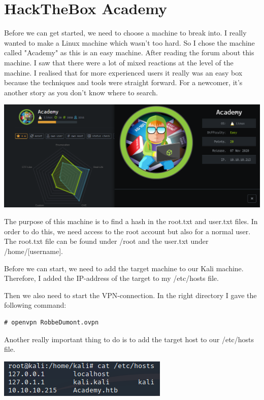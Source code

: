 \documentclass[../main.tex]{subfiles}
\begin{document}
\section{HackTheBox Academy}

Before we can get started, we need to choose a machine to break into. I really wanted to make a Linux machine which wasn't too hard. So I chose the machine called "Academy" as this is an easy machine. After reading the forum about this machine. I saw that there were a lot of mixed reactions at the level of the machine. I realised that for more experienced users it really was an easy box because the techniques and tools were straight forward. For a newcomer, it's another story as you don't know where to search. 

\includegraphics[width=\linewidth]{images/Robbe/Academy_intro5.png}


The purpose of this machine is to find a hash in the root.txt and user.txt files. In order to do this, we need access to the root account but also for a normal user. The root.txt file can be found under /root and the user.txt under /home/[username]. 

Before we can start, we need to add the target machine to our Kali machine. Therefore, I added the IP-address of the target to my /etc/hosts file.

Then we also need to start the VPN-connection. In the right directory I gave the following command:

\begin{lstlisting}
# openvpn RobbeDumont.ovpn
\end{lstlisting}

Another really important thing to do is to add the target host to our /etc/hosts file.

\includegraphics[width=\linewidth]{images/Robbe/Academy_intro4.png}
\end{document}
